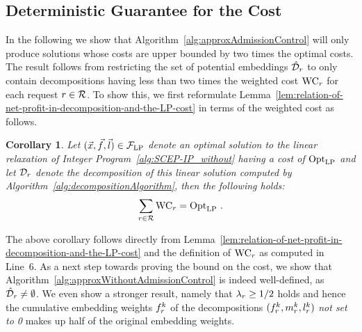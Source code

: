 \documentclass[10pt, conference, letterpaper]{IEEEtran}
\newtheorem{corollary}[theorem]{Corollary}
\begin{document}
\subsection{Deterministic Guarantee for the Cost}

In the following we show that Algorithm~\ref{alg:approxAdmissionControl} will only produce solutions whose costs are upper bounded by two times the optimal costs. The result follows from restricting the set of potential embeddings $\PotEmbeddingsHat$ to only contain decompositions having less than two times the weighted cost $\WAC$ for each request $r \in \mathcal{R}$. To show this, we first reformulate Lemma~\ref{lem:relation-of-net-profit-in-decomposition-and-the-LP-cost} in terms of the weighted cost as follows.

\begin{corollary}
\label{cor:relation-of-net-profit-in-decomposition-and-the-LP-cost-new}
Let $(\vec{x}, \vec{f}, \vec{l}) \in  \mathcal{F}_{\textnormal{LP}}$ denote an \emph{optimal} solution to the linear relaxation of Integer Program~\ref{alg:SCEP-IP_without} having a cost of $\textnormal{Opt}_{\textnormal{LP}}$ and let $\PotEmbeddings$ denote the decomposition of this linear solution computed by Algorithm~\ref{alg:decompositionAlgorithm}, then the following holds:
\begin{align}
\sum_{\req \in \requests} \WAC = \optLP~.
\end{align}
\end{corollary}

The above corollary follows directly from Lemma~\ref{lem:relation-of-net-profit-in-decomposition-and-the-LP-cost} and the definition of $\WAC$ as computed in Line~6. As a next step towards proving the bound on the cost, we show that Algorithm~\ref{alg:approxWithoutAdmissionControl} is indeed well-defined, as $\PotEmbeddingsHat \neq \emptyset$. We even show a stronger result, namely that $\lambda_{r} \geq 1/2$ holds and hence the cumulative embedding weights $\prob$ of the decompositions $(\prob,\mapping,\load)$ \emph{not set to 0} makes up half of the original embedding weights.
\end{document}
